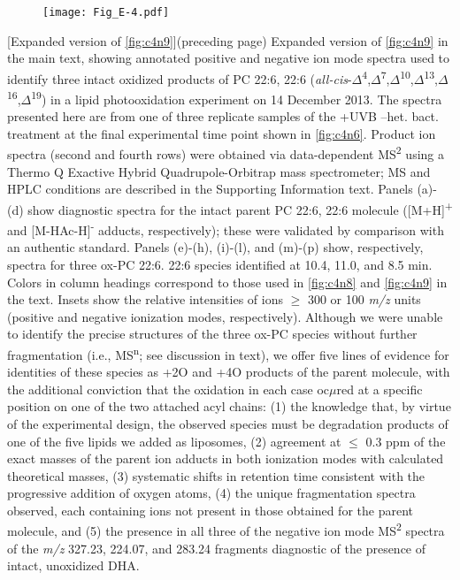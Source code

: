 \clearpage

\begin{landscape}
\begin{figure}[p]
\vspace*{-1.5cm}
\texttt{[image: Fig\_E-4.pdf]}
\end{figure}
\clearpage
\end{landscape}
\begingroup
{}
[Expanded version of \autoref{fig:c4n9}]{(preceding page) Expanded version of \autoref{fig:c4n9} in the main text, showing annotated positive and negative ion mode spectra used to identify three intact oxidized products of PC 22:6, 22:6 (\emph{all-cis}-$\Delta$\textsuperscript{4},$\Delta$\textsuperscript{7},$\Delta$\textsuperscript{10},$\Delta$\textsuperscript{13},$\Delta$\textsuperscript{16},$\Delta$\textsuperscript{19}) in a lipid photooxidation experiment on 14 December 2013. The spectra presented here are from one of three replicate samples of the +UVB --het. bact. treatment at the final experimental time point shown in \autoref{fig:c4n6}. Product ion spectra (second and fourth rows) were obtained via data-dependent MS\textsuperscript{2} using a Thermo Q Exactive Hybrid Quadrupole-Orbitrap mass spectrometer; MS and HPLC conditions are described in the Supporting Information text. Panels (a)-(d) show diagnostic spectra for the intact parent PC 22:6, 22:6 molecule ({[}M+H{]}\textsuperscript{+} and {[}M-HAc-H{]}\textsuperscript{-} adducts, respectively); these were validated by comparison with an authentic standard. Panels (e)-(h), (i)-(l), and (m)-(p) show, respectively, spectra for three ox-PC 22:6. 22:6 species identified at 10.4, 11.0, and 8.5 min. Colors in column headings correspond to those used in \autoref{fig:c4n8} and \autoref{fig:c4n9} in the text. Insets show the relative intensities of ions $\geq$ 300 or 100 \emph{m/z} units (positive and negative ionization modes, respectively). Although we were unable to identify the precise structures of the three ox-PC species without further fragmentation (i.e., MS\textsuperscript{n}; see discussion in text), we offer five lines of evidence for identities of these species as +2O and +4O products of the parent molecule, with the additional conviction that the oxidation in each case oc$\mu$red at a specific position on one of the two attached acyl chains: (1) the knowledge that, by virtue of the experimental design, the observed species must be degradation products of one of the five lipids we added as liposomes, (2) agreement at $\leq$ 0.3 ppm of the exact masses of the parent ion adducts in both ionization modes with calculated theoretical masses, (3) systematic shifts in retention time consistent with the progressive addition of oxygen atoms, (4) the unique fragmentation spectra observed, each containing ions not present in those obtained for the parent molecule, and (5) the presence in all three of the negative ion mode MS\textsuperscript{2} spectra of the \emph{m/z} 327.23, 224.07, and 283.24 fragments diagnostic of the presence of intact, unoxidized DHA.}
\label{fig:aen4}
\endgroup

